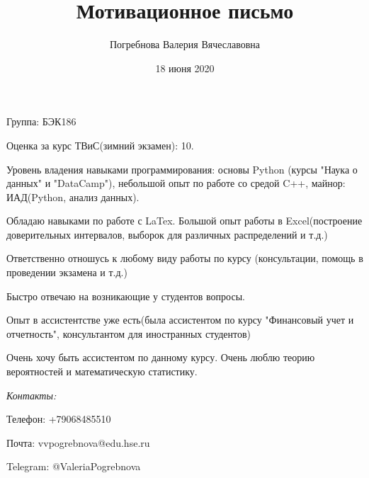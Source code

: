 \documentclass{article}
\title{Мотивационное письмо}
\author{Погребнова Валерия Вячеславовна}
\date{18 июня 2020}
\begin{document}
\maketitle
Группа: БЭК186

Оценка за курс ТВиС(зимний экзамен): 10.

Уровень владения навыками программирования: основы Python (курсы "Наука о данных"  и "DataCamp"), небольшой опыт по работе со средой C++, майнор: ИАД(Python, анализ данных).

Обладаю навыками по работе с LaTex. Большой опыт работы в Excel(построение доверительных интервалов, выборок для различных распределений  и т.д.)

Ответственно отношусь к любому виду работы по курсу (консультации, помощь в проведении экзамена и т.д.)

Быстро отвечаю на возникающие у студентов вопросы.

Опыт в ассистентстве уже есть(была ассистентом по курсу "Финансовый учет и отчетность", консультантом для иностранных студентов)

Очень хочу быть ассистентом по данному курсу. Очень люблю теорию вероятностей и математическую статистику.

\textit{Контакты:}

Телефон: +79068485510

Почта: vvpogrebnova@edu.hse.ru

Telegram: @ValeriaPogrebnova
\end{document}
